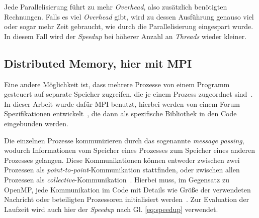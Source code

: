 	Jede Parallelisierung führt zu mehr \textit{Overhead}, also zusätzlich benötigten Rechnungen. Falls es viel \textit{Overhead} gibt, wird zu dessen Ausführung genauso viel oder sogar mehr Zeit gebraucht, wie durch die Parallelisierung eingespart wurde. In diesem Fall wird der \textit{Speedup} bei höherer Anzahl an \textit{Threads} wieder kleiner.
	\subsection{Distributed Memory, hier mit MPI}
	\label{subsecmpitheorie}
	Eine andere Möglichkeit ist, dass mehrere Prozesse von einem Programm gesteuert auf separate Speicher zugreifen, die je einem Prozess zugeordnet sind~\cite[vgl. ][S. 83]{pachecoparallel}. In dieser Arbeit wurde dafür MPI benutzt, hierbei werden von einem Forum Spezifikationen entwickelt~\cite{mpiforum}, die dann als spezifische Bibliothek in den Code eingebunden werden.
	
	Die einzelnen Prozesse kommunizieren durch das sogenannte \textit{message passing}, wodurch Informationen vom Speicher eines Prozesses zum Speicher eines anderen Prozesses gelangen. Diese Kommunikationen können entweder zwischen zwei Prozessen als \textit{point-to-point}-Kommunikation stattfinden, oder zwischen allen Prozessen als \textit{collective}-Kommunikation~\cite[vgl. ][S. 83, S. 103f.]{pachecoparallel}. Hierbei muss, im Gegensatz zu OpenMP, jede Kommunikation im Code mit Details wie Größe der verwendeten Nachricht oder beteiligten Prozessoren initialisiert werden~\cite[vgl. ][S. 88ff.]{pachecoparallel}. Zur Evaluation der Laufzeit wird auch hier der \textit{Speedup} nach Gl. \ref{eq:speedup} verwendet.

